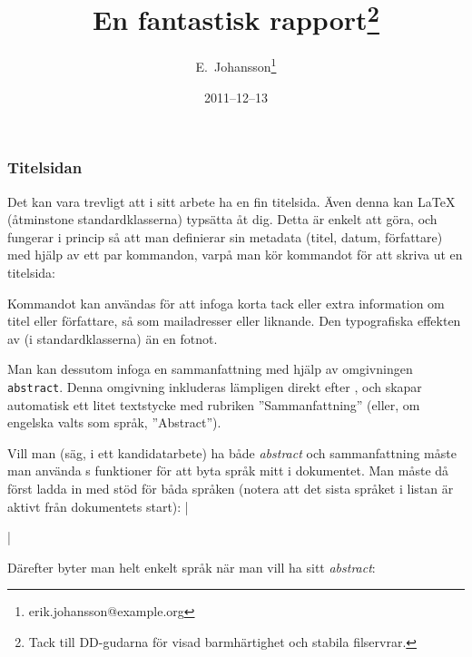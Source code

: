 \documentclass[lang=sv,ptsize=10pt,font=none,nomath,titles=bf,../../a4.tex]{subfiles}
\begin{document}
\subsubsection{Titelsidan}%
Det kan vara trevligt att i sitt arbete ha en fin titelsida. Även denna
kan \LaTeX{} (åtminstone standardklasserna) typsätta åt dig. Detta är
enkelt att göra, och fungerar i princip så att man definierar sin
metadata (titel, datum, författare) med hjälp av ett par kommandon, varpå
man kör kommandot  för att skriva ut en titelsida:
\begin{latexcode}
\title{En fantastisk rapport\thanks{Tack till DD-gudarna
   för visad barmhärtighet och stabila filservrar.}}
\date{2011--12--13}
\author{E.~Johansson\thanks{erik.johansson@example.org}}
\maketitle
\end{latexcode}

Kommandot  kan användas för att infoga korta tack eller extra
information om titel eller författare, så som mailadresser eller
liknande. Den typografiska effekten av  (i standardklasserna)
än en fotnot.

Man kan dessutom infoga en sammanfattning  med hjälp av
omgivningen \texttt{abstract}. Denna omgivning inkluderas lämpligen direkt
efter , och skapar automatisk ett litet textstycke med
rubriken ”Sammanfattning” (eller, om engelska valts som språk,
”Abstract”).

Vill man (säg, i ett kandidatarbete) ha både \emph{abstract} och
sammanfattning måste man använda s funktioner för att byta
språk mitt i dokumentet. Man måste då först ladda in  med stöd 
för båda språken (notera att det sista språket i listan är aktivt från
dokumentets start):
\latex|\usepackage[english,swedish]{babel}|

	Därefter byter man helt enkelt språk när man vill ha sitt \emph{abstract}:
\begin{latexcode}
\begin{otherlanguage}{english}
\begin{abstract}
\end{abstract}
\end{otherlanguage}
\begin{abstract}
\end{abstract}
\end{latexcode}
\end{document}
